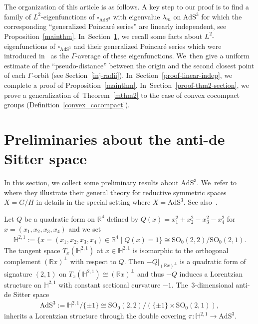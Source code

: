 \documentclass[pdftex]{sigma}
\numberwithin{equation}{section}
\begin{document}
The organization of this article is as follows.
A key step to our proof is to find a family of $L^2$-eigenfunctions
of $\square_{\mathrm{AdS}^{3}}$ with eigenvalue $\lambda_{m}$ on $\mathrm{AdS}^{3}$
for which the corresponding
``generalized Poincar\'e series'' are linearly independent, see Proposition~\ref{mainthm}. In~Section~\ref{Preliminary-AdS},
we recall some facts about
$L^2$-eigenfunctions of $\square_{\mathrm{AdS}^{3}}$
and their generalized Poincar\'e series which were
introduced in~\cite{KaKob16} as the $\Gamma$-average of these eigenfunctions. We~then give a uniform estimate of the ``pseudo-distance''
between the origin and the second closest point of each $\Gamma$-orbit
(see Section~\ref{inj-radii}). In~Section~\ref{proof-linear-indep}, we complete a proof of Proposition~\ref{mainthm}. In~Section~\ref{proof-thm2-section}, we prove a generalization of~Theorem~\ref{mthm2}
to the case of convex cocompact groups (Definition~\ref{convex_cocompact}).

\section{Preliminaries about the anti-de Sitter space}
\label{Preliminary-AdS}

In this section, we collect some preliminary results about $\mathrm{AdS}^{3}$. We~refer to \cite[Section~9]{KaKob16} where they illustrate their general theory
for reductive symmetric spaces $X=G/H$ in details in the special setting where
$X=\mathrm{AdS}^{3}$. See also~\cite{Kan19}.

Let $Q$ be a quadratic form on $\mathbb{R}^{4}$ defined by
$Q(x) = x_1^2 + x_2^2-x_3^2-x_4^2$ for $x= (x_1,x_2,x_3,x_4)$ and
we set
\begin{gather*}
\mathbb{H}^{2,1}:=\big\{x=(x_1,x_2,x_3,x_4) \in \mathbb{R}^4 \mid Q(x) = 1\big\}
\cong \mathrm{SO}_{0}(2,2)/\mathrm{SO}_{0}(2,1).
\end{gather*}
The tangent space $T_{x}(\mathbb{H}^{2,1})$ at $x\in\mathbb{H}^{2,1}$
is isomorphic to the orthogonal complement $(\mathbb{R} x)^{\bot}$ with respect to $Q$.
Then $-Q|_{(\mathbb{R} x)^{\bot}}$ is
a quadratic form of signature $(2,1)$ on
$T_{x}(\mathbb{H}^{2,1}) \cong (\mathbb{R} x)^{\bot}$ and
thus $-Q$ induces a Lorentzian structure on $\mathbb{H}^{2,1}$
with constant sectional curvature $-1$.
The~$3$-di\-men\-sional anti-de Sitter space
\begin{gather*}
\mathrm{AdS}^{3}:=\mathbb{H}^{2,1}/\{\pm 1\}
\cong \mathrm{SO}_{0}(2,2)/(\{\pm1\}\times\mathrm{SO}_{0}(2,1)),
\end{gather*}
inherits a Lorentzian structure through
the double covering $\pi\colon\mathbb{H}^{2,1}\rightarrow\mathrm{AdS}^{3}$.
\end{document}
